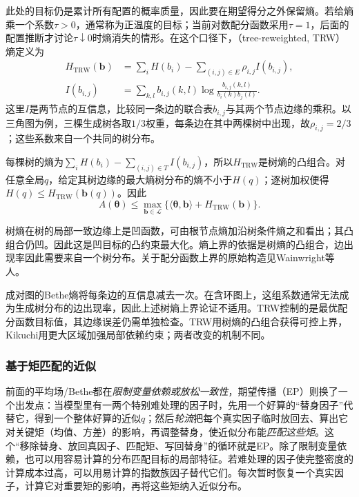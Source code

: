 此处的目标仍是累计所有配置的概率质量，因此要在期望得分之外保留熵。若给熵乘一个系数$\tau>0$，通常称为正温度的目标；当前对数配分函数采用$\tau=1$，后面的配置推断才讨论$\tau\downarrow0$时熵消失的情形。在这个口径下，（tree-reweighted, TRW）熵定义为
\begin{equation}
  \begin{aligned}
    H_{\mathrm{TRW}}(\bm b)
      &=\sum_iH(b_i)-\sum_{(i,j)\in E}\rho_{i,j}I(b_{i,j}),\\
    I(b_{i,j})
      &=\sum_{k,l}b_{i,j}(k,l)
            \log\frac{b_{i,j}(k,l)}{b_i(k)b_j(l)}.
  \end{aligned}
  \label{eq:pgm-variational-trw-entropy}
\end{equation}
这里$I$是两节点的互信息，比较同一条边的联合表$b_{i,j}$与其两个节点边缘的乘积。以三角图为例，三棵生成树各取$1/3$权重，每条边在其中两棵树中出现，故$\rho_{i,j}=2/3$；这些系数来自一个共同的树分布。

每棵树的熵为$\sum_iH(b_i)-\sum_{(i,j)\in T}I(b_{i,j})$，所以$H_{\mathrm{TRW}}$是树熵的凸组合。对任意全局$q$，给定其树边缘的最大熵树分布的熵不小于$H(q)$；逐树加权便得$H(q)\leq H_{\mathrm{TRW}}(\bm b(q))$。因此
\begin{equation}
  A(\bm{\theta})\leq
    \max_{\bm b\in\mathcal L}
       \{\langle\bm{\theta},\bm b\rangle+H_{\mathrm{TRW}}(\bm b)\}.
  \label{eq:pgm-variational-trw-partition}
\end{equation}

树熵在树的局部一致边缘上是凹函数，可由根节点熵加沿树条件熵之和看出；其凸组合仍凹。因此这是凹目标的凸约束最大化。熵上界的依据是树熵的凸组合，边出现率因此需要来自一个树分布。关于配分函数上界的原始构造见Wainwright等人。

成对图的Bethe熵将每条边的互信息减去一次。在含环图上，这组系数通常无法成为生成树分布的边出现率，因此上述树熵上界论证不适用。TRW控制的是最优配分函数目标值，其边缘误差仍需单独检查。TRW用树熵的凸组合获得可控上界，Kikuchi用更大区域加强局部依赖约束；两者改变的机制不同。

\subsubsection{基于矩匹配的近似}

\label{sec:pgm-variational-ep}

前面的平均场/Bethe都在\emph{限制变量依赖或放松一致性}，期望传播（EP）则换了一个出发点：当模型里有一两个特别难处理的因子时，先用一个好算的“替身因子”代替它，得到一个整体好算的近似$q$；然后\emph{轮流}把每个真实因子临时放回去、算出它对关键矩（均值、方差）的影响，再调整替身，使近似分布能\emph{匹配这些矩}。这个“移除替身、放回真因子、匹配矩、写回替身”的循环就是EP。除了限制变量依赖，也可以用容易计算的分布匹配目标的局部特征。若难处理的因子使完整密度的计算成本过高，可以用易计算的指数族因子替代它们。每次暂时恢复一个真实因子，计算它对重要矩的影响，再将这些矩纳入近似分布。

